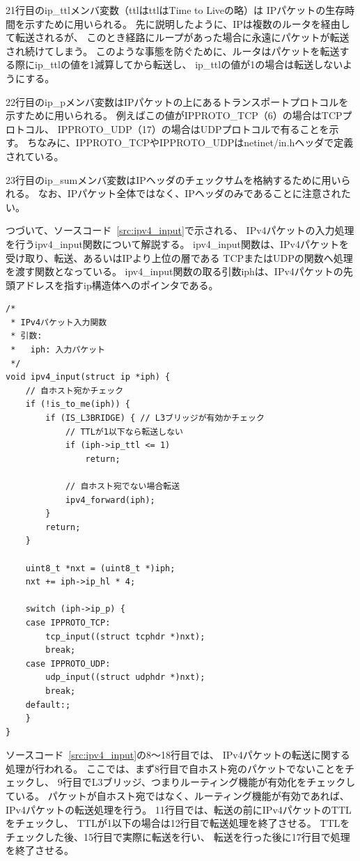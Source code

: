 21行目のip\_ttlメンバ変数（ttlはttlはTime to Liveの略）は
IPパケットの生存時間を示すために用いられる。
先に説明したように、IPは複数のルータを経由して転送されるが、
このとき経路にループがあった場合に永遠にパケットが転送され続けてしまう。
このような事態を防ぐために、ルータはパケットを転送する際にip\_ttlの値を1減算してから転送し、
ip\_ttlの値が1の場合は転送しないようにする。

22行目のip\_pメンバ変数はIPパケットの上にあるトランスポートプロトコルを示すために用いられる。
例えばこの値がIPPROTO\_TCP（6）の場合はTCPプロトコル、
IPPROTO\_UDP（17）の場合はUDPプロトコルで有ることを示す。
ちなみに、IPPROTO\_TCPやIPPROTO\_UDPはnetinet/in.hヘッダで定義されている。

23行目のip\_sumメンバ変数はIPヘッダのチェックサムを格納するために用いられる。
なお、IPパケット全体ではなく、IPヘッダのみであることに注意されたい。

つづいて、ソースコード~\ref{src:ipv4_input}で示される、
IPv4パケットの入力処理を行うipv4\_input関数について解説する。
ipv4\_input関数は、IPv4パケットを受け取り、転送、あるいはIPより上位の層である
TCPまたはUDPの関数へ処理を渡す関数となっている。
ipv4\_input関数の取る引数iphは、IPv4パケットの先頭アドレスを指すip構造体へのポインタである。

\begin{lstlisting}[caption=ipv4\_input関数,label=src:ipv4_input]
/*
 * IPv4パケット入力関数
 * 引数:
 *   iph: 入力パケット
 */
void ipv4_input(struct ip *iph) {
    // 自ホスト宛かチェック
    if (!is_to_me(iph)) {
        if (IS_L3BRIDGE) { // L3ブリッジが有効かチェック
            // TTLが1以下なら転送しない
            if (iph->ip_ttl <= 1)
                return;

            // 自ホスト宛でない場合転送
            ipv4_forward(iph);
        }
        return;
    }

    uint8_t *nxt = (uint8_t *)iph;
    nxt += iph->ip_hl * 4;

    switch (iph->ip_p) {
    case IPPROTO_TCP:
        tcp_input((struct tcphdr *)nxt);
        break;
    case IPPROTO_UDP:
        udp_input((struct udphdr *)nxt);
        break;
    default:;
    }
}
\end{lstlisting}

ソースコード~\ref{src:ipv4_input}の8〜18行目では、
IPv4パケットの転送に関する処理が行われる。
ここでは、まず8行目で自ホスト宛のパケットでないことをチェックし、
9行目でL3ブリッジ、つまりルーティング機能が有効化をチェックしている。
パケットが自ホスト宛ではなく、ルーティング機能が有効であれば、IPv4パケットの転送処理を行う。
11行目では、転送の前にIPv4パケットのTTLをチェックし、
TTLが1以下の場合は12行目で転送処理を終了させる。
TTLをチェックした後、15行目で実際に転送を行い、
転送を行った後に17行目で処理を終了させる。

